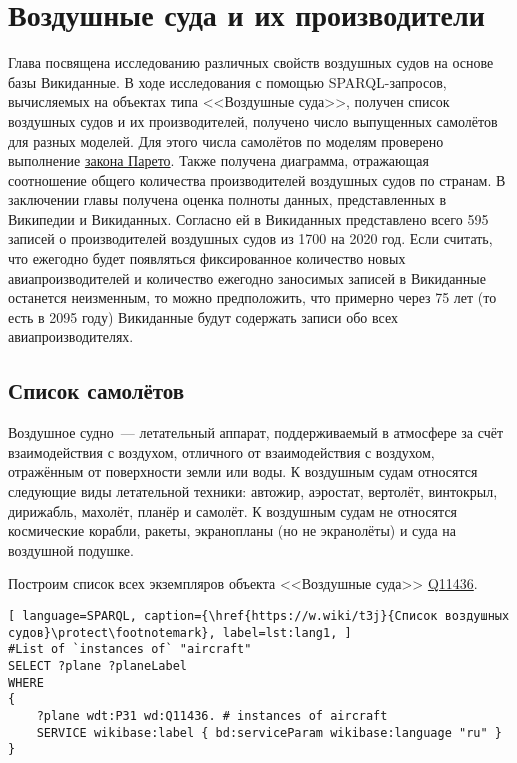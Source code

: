 \chapter{Воздушные суда и их производители}%
\label{ch:aircraft-chapter}

Глава посвящена исследованию различных свойств воздушных судов на основе базы Викиданные. 
В ходе исследования с помощью SPARQL-запросов, вычисляемых на объектах типа <<Воздушные суда>>, 
получен список воздушных судов и их производителей, получено число выпущенных самолётов для разных моделей. Для этого числа самолётов по моделям проверено выполнение \href{https://w.wiki/vDs}{закона Парето}. 
Также получена диаграмма, отражающая соотношение общего количества производителей воздушных судов по странам. 
В заключении главы получена оценка полноты данных, представленных в Википедии и Викиданных. Согласно ей в Викиданных представлено всего 595 записей о производителей воздушных судов из \num{1700} на 2020 год.
Если считать, что ежегодно будет появляться фиксированное количество новых авиапроизводителей и количество ежегодно заносимых записей в Викиданные останется неизменным, то можно предположить, что примерно через 75 лет (то есть в 2095 году) Викиданные будут содержать записи обо всех авиапроизводителях.

\section{Список самолётов}

Воздушное судно~--- летательный аппарат, поддерживаемый в атмосфере за счёт взаимодействия с воздухом, отличного от взаимодействия с воздухом, отражённым от поверхности земли или воды.
К воздушным судам относятся следующие виды летательной техники: автожир, аэростат, вертолёт, винтокрыл, дирижабль, махолёт, планёр и самолёт.
К воздушным судам не относятся космические корабли, ракеты, экранопланы (но не экранолёты) и суда на воздушной подушке. 

Построим список всех экземпляров объекта <<Воздушные суда>> \href{https://www.wikidata.org/wiki/Q11436}{Q11436}.


\begin{lstlisting}[ language=SPARQL, caption={\href{https://w.wiki/t3j}{Список воздушных судов}\protect\footnotemark}, label=lst:lang1, ]
#List of `instances of` "aircraft"
SELECT ?plane ?planeLabel
WHERE
{
    ?plane wdt:P31 wd:Q11436. # instances of aircraft
    SERVICE wikibase:label { bd:serviceParam wikibase:language "ru" }
}
\end{lstlisting}

